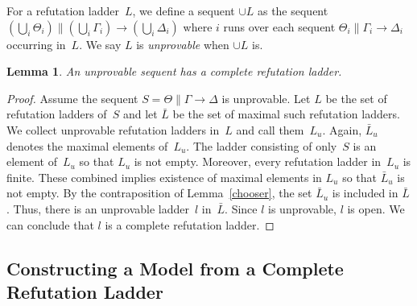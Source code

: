 \documentclass[doctor]{iscs-thesis}
\newtheorem{lemma}{Lemma}
\begin{document}
For a refutation ladder~$L$, we define a sequent $\cup L$ as
the sequent $\left(\bigcup_i \Theta_i\right)\parallel \left(\bigcup_i \Gamma_i\right)\longrightarrow
\left(\bigcup_i\Delta_i\right)$ where $i$ runs over
each sequent $\Theta_i\parallel \Gamma_i\longrightarrow\Delta_i$
occurring in~$L$.
We say $L$ is \textit{unprovable} when $\cup L$ is.

\begin{lemma}
 \label{comprefl}
 An unprovable sequent has a complete refutation ladder.
\end{lemma}
\begin{proof}
Assume the sequent
$S = \Theta\parallel \Gamma\longrightarrow\Delta$
is unprovable.
Let $L$ be the set of refutation ladders of~$S$ and
let $\bar L$ be the set of maximal such refutation ladders.
We collect unprovable refutation ladders in~$L$ and call them~$L_u$.
Again, $\bar L_u$ denotes the maximal elements of~$L_u$.
The ladder consisting of only~$S$ is an element of~$L_u$
so that $L_u$ is not empty.
 Moreover, every refutation ladder in~$L_u$ is finite.
These combined implies existence of maximal elements in $L_u$ so that $\bar L_u$ is not empty.
By the contraposition of Lemma~\ref{chooser}, the set $\bar L_u$ is included in $\bar L$.
Thus, there is an unprovable ladder~$l$ in~$\bar L$.
Since $l$ is unprovable, $l$ is open.
We can conclude that $l$ is a complete refutation ladder. 
\end{proof}


\subsection{Constructing a Model from a Complete Refutation Ladder}
\end{document}
